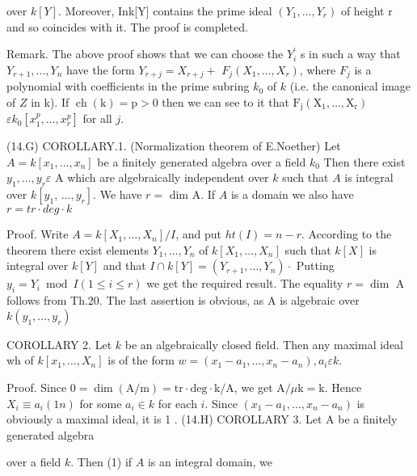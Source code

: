 over $k[Y]$. Moreover, Ink[Y] contains the prime ideal $\left(Y_{1}, \ldots, Y_{r}\right)$ of height $\mathrm{r}$ and so coincides with it. The proof is completed.

Remark. The above proof shows that we can choose the $Y_{i}^{\prime}$ s in such a way that $Y_{r+1}, \ldots, Y_{n}$ have the form $Y_{r+j}=X_{r+j}+$ $F_{j}\left(X_{1}, \ldots, X_{r}\right)$, where $F_{j}$ is a polynomial with coefficients in the prime subring $k_{0}$ of $k$ (i.e. the canonical image of $Z$ in k). If $\operatorname{ch}(\mathrm{k})=\mathrm{p}>0$ then we can see to it that $\mathrm{F}_{\mathrm{j}}\left(\mathrm{X}_{1}, \ldots, \mathrm{X}_{\mathrm{r}}\right)$ $\varepsilon k_{0}\left[x_{1}^{p}, \ldots, x_{r}^{p}\right]$ for all $j$.

(14.G) COROLLARY.1. (Normalization theorem of E.Noether) Let $A=k\left[x_{1}, \ldots, x_{n}\right]$ be a finitely generated algebra over a field $k_{0}$ Then there exist $y_{1}, \ldots, y_{r} \varepsilon$ A which are algebraically independent over $k$ such that $A$ is integral over $k\left[y_{1}\right.$, $\left.\ldots, y_{r}\right]$. We have $r=$ dim A. If $A$ is a domain we also have $r=t r \cdot d e g \cdot k$

Proof. Write $A=k\left[X_{1}, \ldots, X_{n}\right] / I$, and put $h t(I)=n-r$. According to the theorem there exist elements $Y_{1}, \ldots, Y_{n}$ of $k\left[X_{1}, \ldots, X_{n}\right]$ such that $k[X]$ is integral over $k[Y]$ and that $I \cap k[Y]=\left(Y_{r+1}, \ldots, Y_{n}\right) \cdot$ Putting $y_{i}=Y_{i} \bmod I(1 \leqslant i \leqslant r)$ we get the required result. The equality $r=\operatorname{dim}$ A follows from Th.20. The last assertion is obvious, as A is algebraic over $k\left(y_{1}, \ldots, y_{r}\right)$

COROLLARY 2. Let $k$ be an algebraically closed field. Then any maximal ideal wh of $k\left[x_{1}, \ldots, X_{n}\right]$ is of the form $w=\left(x_{1}-a_{1}, \ldots, x_{n}-a_{n}\right), a_{i} \varepsilon k .$

Proof. Since $0=\operatorname{dim}(\mathrm{A} / \mathrm{m})=\mathrm{tr} \cdot \mathrm{deg} \cdot \mathrm{k} / \mathrm{A}$, we get $\mathrm{A} / \mu \mathrm{k}=\mathrm{k}$. Hence $X_{i} \equiv a_{i}(1 n)$ for some $a_{i} \in k$ for each $i$. Since $\left(x_{1}-a_{1}, \ldots, x_{n}-a_{n}\right)$ is obviously a maximal ideal, it is 1 . (14.H) COROLLARY 3. Let A be a finitely generated algebra

over a field $k$. Then (1) if $A$ is an integral domain, we

